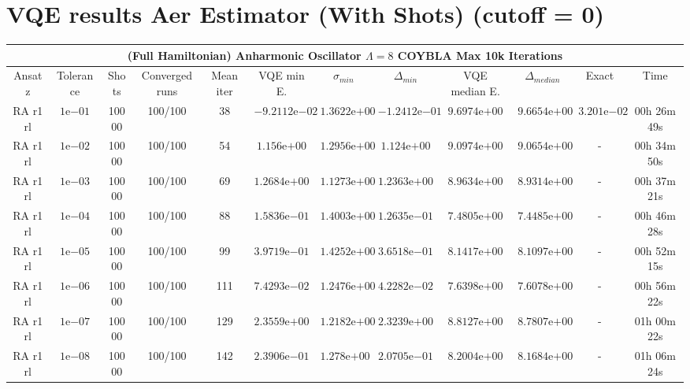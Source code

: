 \documentclass[letterpaper,12pt,openright]{article}
\date{}
\begin{document}
\section{VQE results Aer Estimator (With Shots) (cutoff = 0)}

\begin{table}[H]  
\centering

\begin{adjustbox}{width=\textwidth}

\begin{tabular}{cccccccccccc}
\multicolumn{12}{c}{(Full Hamiltonian) \qquad Anharmonic Oscillator \qquad $\Lambda = 8$ \qquad COYBLA Max 10k Iterations }\\
\hline
\hline
Ansatz & Tolerance & Shots & Converged runs & Mean iter & VQE min E. & $\sigma_{min}$ &$\Delta_{min}$ & VQE median E. &$\Delta_{median}$ & Exact & Time \\ \hline
%
%
RA r1 rl & $1\mathrm{e}{-01}$ & 10000 & 100/100 &38 & $-9.2112\mathrm{e}{-02}$ & $1.3622\mathrm{e}{+00}$ & $-1.2412\mathrm{e}{-01}$ & $9.6974\mathrm{e}{+00}$ & $9.6654\mathrm{e}{+00}$ & $3.201\mathrm{e}{-02}$ & 00h 26m 49s\\
RA r1 rl & $1\mathrm{e}{-02}$ & 10000 & 100/100 &54 & $1.156\mathrm{e}{+00}$ & $1.2956\mathrm{e}{+00}$ & $1.124\mathrm{e}{+00}$ & $9.0974\mathrm{e}{+00}$ & $9.0654\mathrm{e}{+00}$ & - & 00h 34m 50s\\
RA r1 rl & $1\mathrm{e}{-03}$ & 10000 & 100/100 &69 & $1.2684\mathrm{e}{+00}$ & $1.1273\mathrm{e}{+00}$ & $1.2363\mathrm{e}{+00}$ & $8.9634\mathrm{e}{+00}$ & $8.9314\mathrm{e}{+00}$ & - & 00h 37m 21s\\
RA r1 rl & $1\mathrm{e}{-04}$ & 10000 & 100/100 &88 & $1.5836\mathrm{e}{-01}$ & $1.4003\mathrm{e}{+00}$ & $1.2635\mathrm{e}{-01}$ & $7.4805\mathrm{e}{+00}$ & $7.4485\mathrm{e}{+00}$ & - & 00h 46m 28s\\
RA r1 rl & $1\mathrm{e}{-05}$ & 10000 & 100/100 &99 & $3.9719\mathrm{e}{-01}$ & $1.4252\mathrm{e}{+00}$ & $3.6518\mathrm{e}{-01}$ & $8.1417\mathrm{e}{+00}$ & $8.1097\mathrm{e}{+00}$ & - & 00h 52m 15s\\
RA r1 rl & $1\mathrm{e}{-06}$ & 10000 & 100/100 &111 & $7.4293\mathrm{e}{-02}$ & $1.2476\mathrm{e}{+00}$ & $4.2282\mathrm{e}{-02}$ & $7.6398\mathrm{e}{+00}$ & $7.6078\mathrm{e}{+00}$ & - & 00h 56m 22s\\
RA r1 rl & $1\mathrm{e}{-07}$ & 10000 & 100/100 &129 & $2.3559\mathrm{e}{+00}$ & $1.2182\mathrm{e}{+00}$ & $2.3239\mathrm{e}{+00}$ & $8.8127\mathrm{e}{+00}$ & $8.7807\mathrm{e}{+00}$ & - & 01h 00m 22s\\
RA r1 rl & $1\mathrm{e}{-08}$ & 10000 & 100/100 &142 & $2.3906\mathrm{e}{-01}$ & $1.278\mathrm{e}{+00}$ & $2.0705\mathrm{e}{-01}$ & $8.2004\mathrm{e}{+00}$ & $8.1684\mathrm{e}{+00}$ & - & 01h 06m 24s\\


\end{tabular}
\end{adjustbox}
\end{table}
\end{document}
